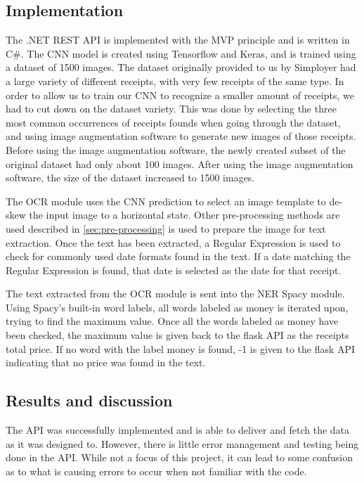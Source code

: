 \subsection{Implementation}\label{implementation}
The .NET REST API is implemented with the MVP principle and is written in C\#.
The CNN model is created using Tensorflow and Keras, and is trained using a dataset of 1500 images.
The dataset originally provided to us by Simployer had a large variety of different receipts, with very few receipts of the same type.
In order to allow us to train our CNN to recognize a smaller amount of receipts, we had to cut down on the dataset variety.
This was done by selecting the three most common occurrences of receipts founds when going through the dataset, and using image augmentation software to generate new images of those receipts.
Before using the image augmentation software, the newly created subset of the original dataset had only about 100 images.
After using the image augmentation software, the size of the dataset increased to 1500 images.

The OCR module uses the CNN prediction to select an image template to de-skew the input image to a horizontal state.
Other pre-processing methods are used described in \ref{sec:pre-processing} is used to prepare the image for text extraction.
Once the text has been extracted, a Regular Expression is used to check for commonly used date formats found in the text.
If a date matching the Regular Expression is found, that date is selected as the date for that receipt.

The text extracted from the OCR module is sent into the NER Spacy module.
Using Spacy's built-in word labels, all words labeled as money is iterated upon, trying to find the maximum value.
Once all the words labeled as money have been checked, the maximum value is given back to the flask API as the receipts total price.
If no word with the label money is found, -1 is given to the flask API indicating that no price was found in the text.

\subsection{Results and discussion}\label{resultsanddiscussion}
The API was successfully implemented and is able to deliver and fetch the data as it was designed to.
However, there is little error management and testing being done in the API.
While not a focus of this project, it can lead to some confusion as to what is causing errors to occur when not familiar with the code.

